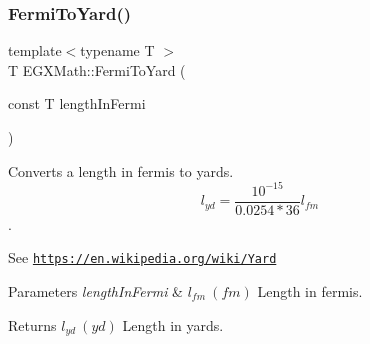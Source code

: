 \subsubsection{\texorpdfstring{Fermi\+To\+Yard()}{FermiToYard()}}
{\footnotesize\ttfamily template$<$typename T $>$ \\
T E\+G\+X\+Math\+::\+Fermi\+To\+Yard (\begin{DoxyParamCaption}\item[{const T}]{length\+In\+Fermi }\end{DoxyParamCaption})}



Converts a length in fermis to yards. \[ l_{yd}= \frac{10^{-15}}{0.0254 * 36} l_{fm} \]. 

See \href{https://en.wikipedia.org/wiki/Yard}{\tt https\+://en.\+wikipedia.\+org/wiki/\+Yard} 
\begin{DoxyParams}{Parameters}
{\em length\+In\+Fermi} & $ l_{fm}\ (fm)$ Length in fermis. \\
\hline
\end{DoxyParams}
\begin{DoxyReturn}{Returns}
$ l_{yd}\ (yd)$ Length in yards. 
\end{DoxyReturn}
